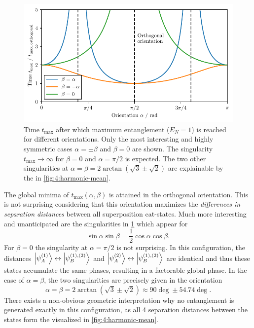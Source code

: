 \begin{figure}[!htbp]
  \centering
  \includegraphics[width=\textwidth]{./../figures/ideal-entanglement/t-max-orientation.pdf}
  \caption{Time $t_\mathrm{max}$ after which maximum entanglement ($E_N = 1$) is reached for different orientations. Only the most interesting and highly symmetric cases $\alpha=\pm\beta$ and $\beta=0$ are shown. The singularity $t_\mathrm{max} \rightarrow \infty$ for $\beta = 0$ and $\alpha = \pi/2$ is expected. The two other singularities at $\alpha = \beta = 2 \arctan(\sqrt{3} \pm \sqrt{2})$ are explainable by the  in \cref{fig:4:harmonic-mean}.}
  \label{fig:4:t-max-orientation}
\end{figure}
The global minima of $t_\mathrm{max}(\alpha,\beta)$ is attained in the orthogonal orientation. This is not surprising considering that this orientation maximizes the \textit{differences in separation distances} between all superposition cat-states.
Much more interesting and unanticipated are the singularities in \cref{fig:4:t-max-orientation} which appear for 
\begin{equation}
  \sin\alpha\sin\beta=\frac{1}{2}\cos\alpha\cos\beta .
\end{equation}
For $\beta=0$ the singularity at $\alpha=\pi/2$ is not surprising. In this configuration, the distances $\ket{\psi^{(1)}_A}\leftrightarrow\ket{\psi^{(1),(2)}_B}$ and $\ket{\psi^{(2)}_A}\leftrightarrow\ket{\psi^{(1),(2)}_B}$ are identical and thus these states accumulate the same phases, resulting in a factorable global phase.
In the case of $\alpha=\beta$, the two singularities are precisely given in the orientation
\begin{equation}
  \alpha=\beta=2 \arctan(\sqrt{3}\pm\sqrt{2})\approx 90\deg \pm 54.74\deg .
\end{equation}
There exists a non-obvious geometric interpretation why no entanglement is generated exactly in this configuration, as all 4 separation distances between the states form the  visualized in \cref{fig:4:harmonic-mean}.
